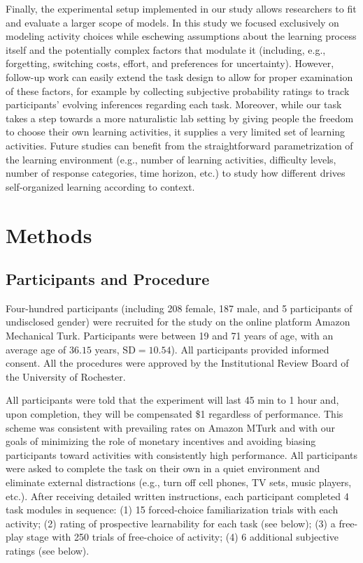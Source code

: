 Finally, the experimental setup implemented in our study allows researchers to fit and evaluate a larger scope of models. In this study we focused exclusively on modeling activity choices while eschewing assumptions about the learning process itself and the potentially complex factors that modulate it (including, e.g., forgetting, switching costs, effort, and preferences for uncertainty). However, follow-up work can easily extend the task design to allow for proper examination of these factors, for example by collecting subjective probability ratings to track participants' evolving inferences regarding each task. Moreover, while our task takes a step towards a more naturalistic lab setting by giving people the freedom to choose their own learning activities, it supplies a very limited set of learning activities. Future studies can benefit from the straightforward parametrization of the learning environment  (e.g., number of learning activities, difficulty levels, number of response categories, time horizon, etc.) to study how different drives self-organized learning according to context.

\section{Methods}\label{CH4_S_methods}

\subsection{Participants and Procedure}\label{CH4_SS_participants_and_procedure}

Four-hundred participants (including 208 female, 187 male, and 5 participants of undisclosed gender) were recruited for the study on the online platform Amazon Mechanical Turk. Participants were between 19 and 71 years of age, with an average age of $36.15$ years, $\text{SD} = 10.54$). All participants provided informed consent. All the procedures were approved by the Institutional Review Board of the University of Rochester.

All participants were told that the experiment will last 45 min to 1 hour and, upon completion, they will be compensated \$1 regardless of performance. This scheme was consistent with prevailing rates on Amazon MTurk and with our goals of minimizing the role of monetary incentives and avoiding biasing participants toward activities with consistently high performance. All participants were asked to complete the task on their own in a quiet environment and eliminate external distractions (e.g., turn off cell phones, TV sets, music players, etc.). After receiving detailed written instructions, each participant completed 4 task modules in sequence: (1) 15 forced-choice familiarization trials with each activity; (2) rating of prospective learnability for each task (see below); (3) a free-play stage with 250 trials of free-choice of activity; (4) 6 additional subjective ratings (see below).

